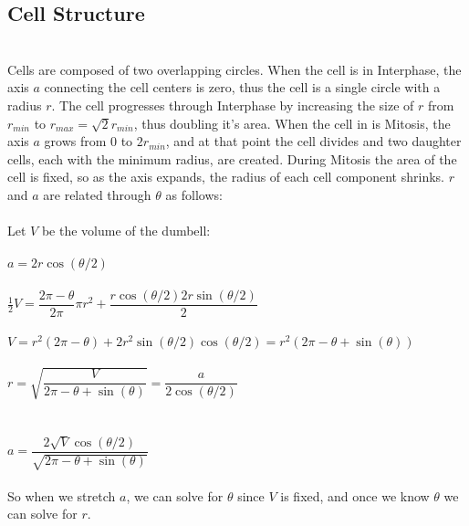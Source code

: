 \documentclass{article}
\begin{document}
\subsection{Cell Structure}
\\
Cells are composed of two overlapping circles. When the cell is in Interphase, the axis $a$ connecting the cell centers is zero, thus the cell is a single circle with a radius $r$. The cell progresses through Interphase by increasing the size of $r$ from $r_{min}$ to $r_{max} = \sqrt{2}r_{min}$, thus doubling it's area. When the cell in is Mitosis, the axis $a$ grows from 0 to $2r_{min}$, and at that point the cell divides and two daughter cells, each with the minimum radius, are created. During Mitosis the area of the cell is fixed, so as the axis expands, the radius of each cell component shrinks. $r$ and $a$ are related through $\theta$ as follows:\\
\\
Let $V$ be the volume of the dumbell:\\
\\
$a = 2r\cos(\theta /2)$\\
\\
$\frac{1}{2}V = \dfrac{2\pi - \theta}{2\pi} \pi r^2 +
\dfrac{r\cos(\theta / 2)2r\sin(\theta / 2)}{2}$\\
\\
$V = r^2(2\pi - \theta) + 2r^2\sin(\theta / 2)\cos(\theta / 2)
= r^2(2\pi - \theta + \sin(\theta))$\\
\\
$r = \sqrt{\dfrac{V}{2\pi - \theta + \sin(\theta)}}
= \dfrac{a}{2\cos(\theta / 2)}$\\
\\
\\
$a = \dfrac{2\sqrt{V}\cos(\theta / 2)}{\sqrt{2\pi - \theta
		+ \sin(\theta)}}$\\
\\
So when we stretch $a$, we can solve for $\theta$ since $V$ is fixed, and once we know $\theta$ we can solve for $r$.\\
\\
\end{document}
